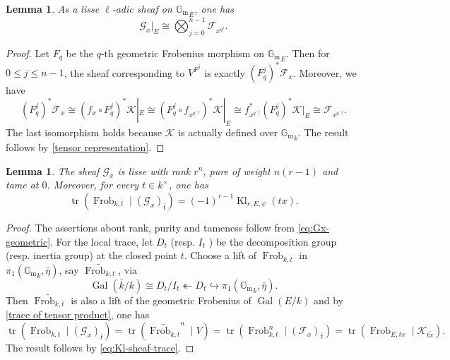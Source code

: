 \documentclass[11pt]{amsart}
\newtheorem{lemma}[theorem]{Lemma}
\theoremstyle{remark}
\newcommand{\Gm}{\mathbb G_{\mathrm m}}
\newcommand{\Frob}{\operatorname{Frob}}
\newcommand{\Kl}{\operatorname{Kl}}
\newcommand{\Gal}{\operatorname{Gal}}
\newcommand{\cF}{\mathcal F}
\newcommand{\cK}{\mathcal K}
\newcommand{\cG}{\mathcal G}
\begin{document}
\begin{lemma}\label{tensor induction decomposition}
As a lisse $\ell$-adic sheaf on ${\Gm}_E$, one has
\begin{equation}\label{eq:Gx-geometric}
    \cG_x|_{E}\cong
        \bigotimes_{j=0}^{n-1}\cF_{x^{q^j}}.
\end{equation}
\end{lemma}

\begin{proof}
    Let $F_q$ be the $q$-th geometric Frobenius morphism on ${\Gm}_E$. Then for $0\le j\le n-1$, the sheaf corresponding to $V^{F^j}$ is exactly  $(F_{q}^j)^*\cF_x$. Moreover, we have
    \[
    (F_{q}^j)^*\cF_x\cong(f_x\circ F_{q}^j)^*\cK|_E\cong(F_{q}^j\circ f_{x^{q^{-j}}})^*\cK|_E\cong f_{x^{q^{-j}}}^*(F_{q}^j)^*\cK|_E\cong \cF_{x^{q^{-j}}}.
    \]
    The last isomorphism holds because $\cK$ is actually defined over ${\Gm}_k$. The result follows by \eqref{tensor representation}.
\end{proof}

\begin{lemma}\label{lem:Gx-basic}
The sheaf $\cG_x$ is lisse with rank $r^n$, pure of weight $n(r-1)$ and tame at $0$. Moreover, for every $t\in k^{\times}$, one has
\begin{equation}\label{eq:Gx-trace}
    \operatorname{tr}\left(\Frob_{k,t}\mid(\cG_x)_{\bar{t}}\right)=(-1)^{r-1} \Kl_{r,E,\psi}(tx).
\end{equation}
\end{lemma}

\begin{proof}
The assertions about rank, purity and tameness follow from \eqref{eq:Gx-geometric}. For the local trace, let $D_t$ (resp. $I_t$ ) be the decomposition group (resp. inertia group) at the closed point $t$. Choose a lift of $\Frob_{k,t}$ in $\pi_1({\Gm}_k,\bar{\eta})$, say $\widetilde{\Frob_{k,t}}$, via
\[
\Gal(\bar{k}/k)\cong D_t/I_t\twoheadleftarrow D_t\hookrightarrow\pi_1({\Gm}_k,\bar{\eta}).
\]
Then $\widetilde{\Frob_{k,t}}$ is also a lift of the geometric Frobenius of $\Gal(E/k)$ and by \eqref{trace of tensor product}, one has
\[
\operatorname{tr}\left(\Frob_{k,t}\mid(\cG_x)_{\bar{t}}\right)= \operatorname{tr}(\widetilde{\Frob_{k,t}}^n\mid V)=\operatorname{tr}\left(\Frob_{k,t}^n\mid (\cF_x)_{\bar{t}}\right)=\operatorname{tr}(\Frob_{E,tx}\mid \cK_{\bar{tx}}).
\]
The result follows by \eqref{eq:Kl-sheaf-trace}.
\end{proof}
\end{document}
